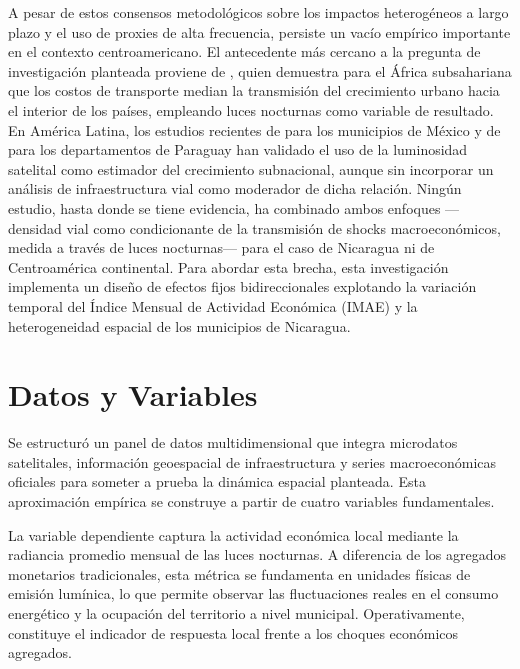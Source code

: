 \documentclass[
  spanish,
  12pt,
  letterpaper]{article}
\begin{document}
A pesar de estos consensos metodológicos sobre los impactos heterogéneos
a largo plazo y el uso de proxies de alta frecuencia, persiste un vacío
empírico importante en el contexto centroamericano. El antecedente más
cercano a la pregunta de investigación planteada proviene de
\textcite{storeygard2016farther}, quien demuestra para el África
subsahariana que los costos de transporte median la transmisión del
crecimiento urbano hacia el interior de los países, empleando luces
nocturnas como variable de resultado. En América Latina, los estudios
recientes de \textcite{millan2024luces} para los municipios de México y
de \textcite{mccord2022nightlights} para los departamentos de Paraguay
han validado el uso de la luminosidad satelital como estimador del
crecimiento subnacional, aunque sin incorporar un análisis de
infraestructura vial como moderador de dicha relación. Ningún estudio,
hasta donde se tiene evidencia, ha combinado ambos enfoques ---densidad
vial como condicionante de la transmisión de shocks macroeconómicos,
medida a través de luces nocturnas--- para el caso de Nicaragua ni de
Centroamérica continental. Para abordar esta brecha, esta investigación
implementa un diseño de efectos fijos bidireccionales explotando la
variación temporal del Índice Mensual de Actividad Económica (IMAE) y la
heterogeneidad espacial de los municipios de Nicaragua.

\section{Datos y Variables}\label{sec-datos}

Se estructuró un panel de datos multidimensional que integra microdatos
satelitales, información geoespacial de infraestructura y series
macroeconómicas oficiales para someter a prueba la dinámica espacial
planteada. Esta aproximación empírica se construye a partir de cuatro
variables fundamentales.

La variable dependiente captura la actividad económica local mediante la
radiancia promedio mensual de las luces nocturnas. A diferencia de los
agregados monetarios tradicionales, esta métrica se fundamenta en
unidades físicas de emisión lumínica, lo que permite observar las
fluctuaciones reales en el consumo energético y la ocupación del
territorio a nivel municipal. Operativamente, constituye el indicador de
respuesta local frente a los choques económicos agregados.
\end{document}
